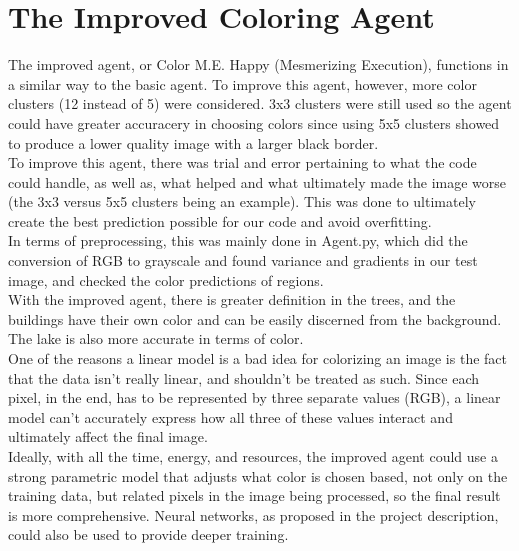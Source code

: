\documentclass[12pt]{report}
\begin{document}
\section*{The Improved Coloring Agent}
The improved agent, or Color M.E. Happy (Mesmerizing Execution), functions in a similar way to the basic agent. To improve this agent, however, more color clusters (12 instead of 5) were considered. 3x3 clusters were still used so the agent could have greater accuracery in choosing colors since using 5x5 clusters showed to produce a lower quality image with a larger black border.\\
To improve this agent, there was trial and error pertaining to what the code could handle, as well as, what helped and what ultimately made the image worse (the 3x3 versus 5x5 clusters being an example). This was done to ultimately create the best prediction possible for our code and avoid overfitting.\\
In terms of preprocessing, this was mainly done in Agent.py, which did the conversion of RGB to grayscale and found variance and gradients in our test image, and checked the color predictions of regions.\\
With the improved agent, there is greater definition in the trees, and the buildings have their own color and can be easily discerned from the background. The lake is also more accurate in terms of color.\\
One of the reasons a linear model is a bad idea for colorizing an image is the fact that the data isn't really linear, and shouldn't be treated as such. Since each pixel, in the end, has to be represented by three separate values (RGB), a linear model can't accurately express how all three of these values interact and ultimately affect the final image.\\
Ideally, with all the time, energy, and resources, the improved agent could use a strong parametric model that adjusts what color is chosen based, not only on the training data, but related pixels in the image being processed, so the final result is more comprehensive. Neural networks, as proposed in the project description, could also be used to provide deeper training.
\end{document}
